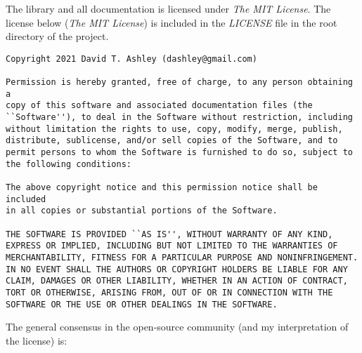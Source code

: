 The \emph{\productbasenameshort{}} library and all 
documentation is licensed under \emph{The MIT License}.  The 
license below (\emph{The MIT License}) is included in the 
\emph{LICENSE} file in the root directory of the project.  

\begin{small}
\begin{verbatim}
Copyright 2021 David T. Ashley (dashley@gmail.com)

Permission is hereby granted, free of charge, to any person obtaining a 
copy of this software and associated documentation files (the 
``Software''), to deal in the Software without restriction, including 
without limitation the rights to use, copy, modify, merge, publish, 
distribute, sublicense, and/or sell copies of the Software, and to 
permit persons to whom the Software is furnished to do so, subject to 
the following conditions: 

The above copyright notice and this permission notice shall be included 
in all copies or substantial portions of the Software.  

THE SOFTWARE IS PROVIDED ``AS IS'', WITHOUT WARRANTY OF ANY KIND, 
EXPRESS OR IMPLIED, INCLUDING BUT NOT LIMITED TO THE WARRANTIES OF 
MERCHANTABILITY, FITNESS FOR A PARTICULAR PURPOSE AND NONINFRINGEMENT.  
IN NO EVENT SHALL THE AUTHORS OR COPYRIGHT HOLDERS BE LIABLE FOR ANY 
CLAIM, DAMAGES OR OTHER LIABILITY, WHETHER IN AN ACTION OF CONTRACT, 
TORT OR OTHERWISE, ARISING FROM, OUT OF OR IN CONNECTION WITH THE 
SOFTWARE OR THE USE OR OTHER DEALINGS IN THE SOFTWARE.  
\end{verbatim}
\end{small}

The general consensus in the open-source community 
(and my interpretation of the license) is:

